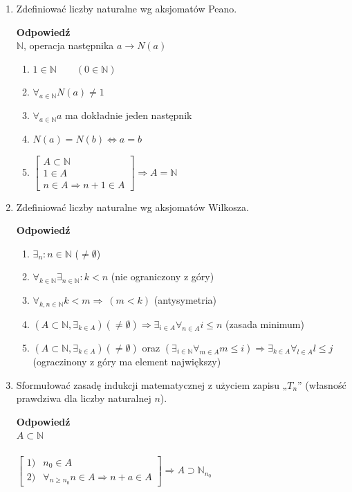 \documentclass[12pt,a4paper]{article}
\theoremstyle{break}
\newcommand{\Odp}[1]{
		\begin{mdframed}[style=zadanie]
			\textbf{Odpowiedź}\\
			#1
		\end{mdframed}
	}
\begin{document}
\begin{enumerate}[1.]
	\item Zdefiniować liczby naturalne wg aksjomatów Peano.
	\Odp{
			$\mathbb{N}$, operacja następnika $a \rightarrow N(a)$
			\begin{enumerate}[1)]
				\item $1\in \mathbb{N} \qquad (0\in \mathbb{N})$
				\item $\forall_{a\in\mathbb{N}} N(a)\neq 1$
				\item $\forall_{a\in \mathbb{N}} a$ ma dokładnie jeden następnik
				\item $N(a)=N(b) \Leftrightarrow a=b$
				\item $\begin{bmatrix}
					A\subset \mathbb{N}\\
					1\in A\\
					n\in A \Rightarrow n+1\in A
				\end{bmatrix} \Rightarrow A=\mathbb{N}$
			\end{enumerate}
	}
	
	\item Zdefiniować liczby naturalne wg aksjomatów Wilkosza.
	\Odp{
	\begin{enumerate}[1)]
		\item $\exists_n : n\in\mathbb{N}$ ($\neq \emptyset$)
		\item $\forall_{k\in\mathbb{N}} \exists_{n\in\mathbb{N}}:k<n$ (nie ograniczony z góry)
		\item $\forall_{k,n\in \mathbb{N}} k<m \Rightarrow ~(m<k)$ (antysymetria)
		\item $(A\subset\mathbb{N}, \exists_{k\in A})(\neq\emptyset) \Rightarrow \exists_{i\in A} \forall_{n\in A} i\leq n$ (zasada minimum)
		\item $(A\subset\mathbb{N}, \exists_{k\in A})(\neq\emptyset)$ oraz  $ (\exists_{i\in \mathbb{N}} \forall_{m\in A} m\leq i)\Rightarrow \exists_{k\in A} \forall_{l\in A} l\leq j$ (ograczinony z góry ma element największy)
	\end{enumerate}
	}
	\newpage
	\item Sformułować zasadę indukcji matematycznej z użyciem zapisu „$T_n$” (własność prawdziwa dla liczby naturalnej $n$).
	\Odp{
		$A\subset \mathbb{N}$\\\\
		
		$\begin{bmatrix}
			1) & n_0\in A\\
			2) & \forall_{n\geq n_0} n\in A \Rightarrow n+a\in A
		\end{bmatrix} \Rightarrow A \supset \mathbb{N}_{n_0}$\\\\
		
}
\end{enumerate}
\end{document}
